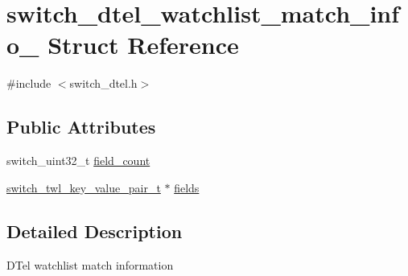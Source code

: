 \hypertarget{structswitch__dtel__watchlist__match__info__}{\section{switch\+\_\+dtel\+\_\+watchlist\+\_\+match\+\_\+info\+\_\+ Struct Reference}
\label{structswitch__dtel__watchlist__match__info__}
}


{\ttfamily \#include $<$switch\+\_\+dtel.\+h$>$}

\subsection*{Public Attributes}
\begin{DoxyCompactItemize}
\item 
switch\+\_\+uint32\+\_\+t \hyperlink{structswitch__dtel__watchlist__match__info___a5f5429cd7a0407a75037779fe4ce6d39}{field\+\_\+count}
\item 
\hyperlink{group__DTel_ga32b4f5a66b9bce81be295a7388eadb04}{switch\+\_\+twl\+\_\+key\+\_\+value\+\_\+pair\+\_\+t} $\ast$ \hyperlink{structswitch__dtel__watchlist__match__info___a6bce3a0c9c39f62983d8a9ed30af35b3}{fields}
\end{DoxyCompactItemize}


\subsection{Detailed Description}
D\+Tel watchlist match information 

